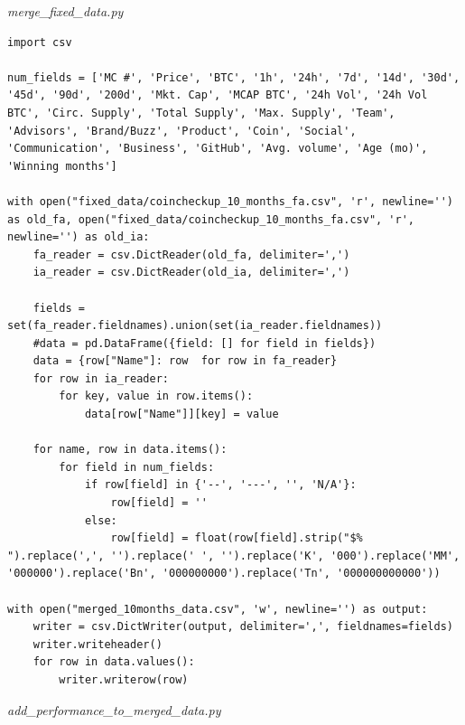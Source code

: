 \documentclass[11pt, english, letterpaper]{article}
\begin{document}
\newpage
\emph{merge\_fixed\_data.py}
\begin{lstlisting}
import csv

num_fields = ['MC #', 'Price', 'BTC', '1h', '24h', '7d', '14d', '30d', '45d', '90d', '200d', 'Mkt. Cap', 'MCAP BTC', '24h Vol', '24h Vol BTC', 'Circ. Supply', 'Total Supply', 'Max. Supply', 'Team', 'Advisors', 'Brand/Buzz', 'Product', 'Coin', 'Social', 'Communication', 'Business', 'GitHub', 'Avg. volume', 'Age (mo)', 'Winning months']

with open("fixed_data/coincheckup_10_months_fa.csv", 'r', newline='') as old_fa, open("fixed_data/coincheckup_10_months_fa.csv", 'r', newline='') as old_ia:
    fa_reader = csv.DictReader(old_fa, delimiter=',')
    ia_reader = csv.DictReader(old_ia, delimiter=',')

    fields = set(fa_reader.fieldnames).union(set(ia_reader.fieldnames))
    #data = pd.DataFrame({field: [] for field in fields})
    data = {row["Name"]: row  for row in fa_reader}
    for row in ia_reader:
        for key, value in row.items():
            data[row["Name"]][key] = value

    for name, row in data.items():
        for field in num_fields:
            if row[field] in {'--', '---', '', 'N/A'}:
                row[field] = ''
            else:
                row[field] = float(row[field].strip("$% ").replace(',', '').replace(' ', '').replace('K', '000').replace('MM', '000000').replace('Bn', '000000000').replace('Tn', '000000000000'))

with open("merged_10months_data.csv", 'w', newline='') as output:
    writer = csv.DictWriter(output, delimiter=',', fieldnames=fields)
    writer.writeheader()
    for row in data.values():
        writer.writerow(row)
\end{lstlisting}


\newpage
\emph{add\_performance\_to\_merged\_data.py}
\end{document}
